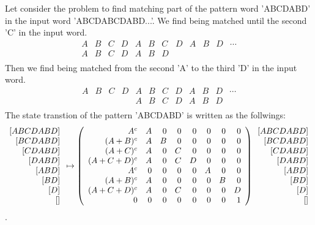 \begin{observe}
Let consider the problem to find matching part of the pattern word 'ABCDABD' 
in the input word 'ABCDABCDABD...'.
We find being matched until the second 'C' in the input word.
\begin{equation}\begin{array}{ccccccc|ccccc}
	A&B&C&D&A&B&C&D&A&B&D&\cdots \\
	A&B&C&D&A&B&D \\
\end{array}\end{equation}
Then we find being matched from the second 'A' to the third 'D' in the
input word.
\begin{equation}\begin{array}{ccccccccccc|c}
	A&B&C&D&A&B&C&D&A&B&D&\cdots \\
	&&&&A&B&C&D&A&B&D \\
\end{array}\end{equation}
The state transtion of the pattern 'ABCDABD' is written as the follwings:
\begin{equation}\begin{split}
	\begin{array}{r}
		\left[{ABCDABD}\right] \\
		\left[{BCDABD}\right] \\
		\left[{CDABD}\right] \\
		\left[{DABD}\right] \\
		\left[{ABD}\right] \\
		\left[{BD}\right] \\
		\left[{D}\right] \\
		\left[{}\right] \\
	\end{array} &\mapsto \left({\begin{array}{rrrrrrrrrr}
		A^c  & A & 0 & 0 & 0 & 0 & 0 & 0 \\
		(A+B)^c  & A & B & 0 & 0 & 0 & 0 & 0 \\
		(A+C)^c  & A & 0 & C & 0 & 0 & 0 & 0 \\
		(A+C+D)^c  & A & 0 & C & D & 0 & 0 & 0 \\
		A^c  & 0 & 0 & 0 & 0 & A & 0 & 0 \\ 
		(A+B)^c  & A & 0 & 0 & 0 & 0 & B & 0 \\
		(A+C+D)^c  & A & 0 & C & 0 & 0 & 0 & D \\
		0 & 0 & 0 & 0 & 0 & 0 & 0 & 1 \\
	\end{array}}\right) \begin{array}{r}
		\left[{ABCDABD}\right] \\ 
		\left[{BCDABD}\right] \\ 
		\left[{CDABD}\right] \\ 
		\left[{DABD}\right] \\
		\left[{ABD}\right] \\
		\left[{BD}\right] \\
		\left[{D}\right] \\
		\left[{}\right] \\
	\end{array} \\
\end{split}\end{equation}
.
\end{observe}

